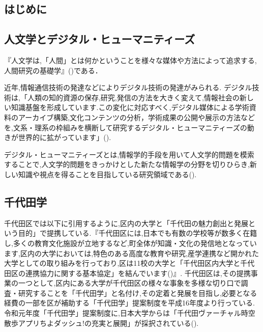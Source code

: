\documentclass[a4paper, twoside]{jarticle}
\begin{document}
\maketitle %
\begin{multicols}{2} %
\setcounter{page}{1} %

\section{はじめに}

\subsection{人文学とデジタル・ヒューマニティーズ}
『人文学は,「人間」とは何かということを様々な媒体や方法によって追求する,人間研究の基礎学』(\cite{huma})である．\par
近年,情報通信技術の発達などによりデジタル技術の発達がみられる.
デジタル技術は,「人類の知的資源の保存,研究,発信の方法を大きく変えて,情報社会の新しい知識基盤を形成しています.この変化に対応すべく,デジタル媒体による学術資料のアーカイブ構築,文化コンテンツの分析，学術成果の公開や展示の方法などを,文系・理系の枠組みを横断して研究するデジタル・ヒューマニティーズの動きが世界的に拡がっています」(\cite{digihumu1}).\par

デジタル・ヒューマニティーズとは,情報学的手段を用いて人文学的問題を模索することで,人文学的問題をきっかけとした新たな情報学の分野を切りひらき,新しい知識や視点を得ることを目指している研究領域である(\cite{digihumu2}).

\subsection{千代田学}
千代田区では以下に引用するように,区内の大学と「千代田の魅力創出と発展という目的」で提携している.『千代田区には,日本でも有数の学校等が数多く在籍し,多くの教育文化施設が立地するなど,町全体が知識・文化の発信地となっています,区内の大学においては,特色のある高度な教育や研究,産学連携など開かれた大学としての取り組みを行っており,区は11校の大学と「千代田区内大学と千代田区の連携協力に関する基本協定」を結んでいます(\cite{digi4})』.
千代田区は,その提携事業の一つとして,区内にある大学が千代田区の様々な事象を多様な切り口で調査・研究することを「千代田学」と名付け,その定着と発展を目指し,必要となる経費の一部を区が補助する「千代田学」提案制度を平成16年度より行っている.令和元年度「千代田学」提案制度に,日本大学からは「千代田ヴァーチャル時空散歩アプリちよダッシュ!の充実と展開」が採択されている(\cite{digi5}).


\end{multicols}
\end{document}
